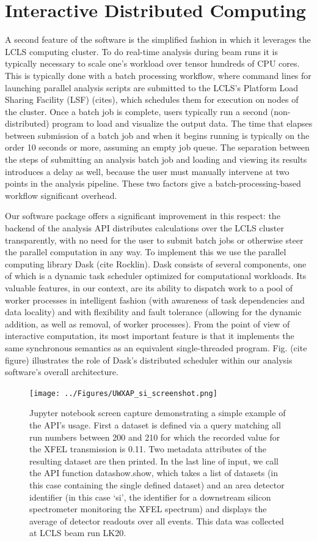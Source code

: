 \section{Interactive Distributed Computing}
A second feature of the software is the simplified fashion in which it leverages the LCLS computing cluster. To do real-time analysis during beam runs it is typically necessary to scale one's workload over tensor hundreds of CPU cores. This is typically done with a batch processing workflow, where command lines for launching parallel analysis scripts are submitted to the LCLS's Platform Load Sharing Facility (LSF) (cites), which schedules them for execution on nodes of the cluster. Once a batch job is complete, users typically run a second (non-distributed) program to load and visualize the output data. The time that elapses between submission of a batch job and when it begins running is typically on the order 10 seconds or more, assuming an empty job queue. The separation between the steps of submitting an analysis batch job and loading and viewing its results introduces a delay as well, because the user must manually intervene at two points in the analysis pipeline. These two factors give a batch-processing-based workflow significant overhead. 

Our software package offers a significant improvement in this respect: the backend of the analysis API distributes calculations over the LCLS cluster transparently, with no need for the user to submit batch jobs or otherwise steer the parallel computation in any way. To implement this we use the parallel computing library Dask (cite Rocklin). Dask consists of several components, one of which is a dynamic task scheduler optimized for computational workloads. Its valuable features, in our context, are its ability to dispatch work to a pool of worker processes in intelligent fashion (with awareness of task dependencies and data locality) and with flexibility and fault tolerance (allowing for the dynamic addition, as well as removal, of worker processes). From the point of view of interactive computation, its most important feature is that it implements the same synchronous semantics as an equivalent single-threaded program. Fig. (cite figure) illustrates the role of Dask's distributed scheduler within our analysis software's overall architecture. 

\begin{figure}[h] \label{uwxap_screenshot}
\caption{Jupyter notebook screen capture demonstrating a simple example of the API's usage. First a dataset is defined via a query matching all run numbers between 200 and 210 for which the recorded value for the XFEL transmission is 0.11. Two metadata attributes of the resulting dataset are then printed. In the last line of input, we call the API function datashow.show, which takes a list of datasets (in this case containing the single defined dataset) and an area detector identifier (in this case `si', the identifier for a downstream silicon spectrometer monitoring the XFEL spectrum) and displays the average of detector readouts over all events. This data was collected at LCLS beam run LK20. }
\centering
\texttt{[image: ../Figures/UWXAP\_si\_screenshot.png]}
\end{figure}

